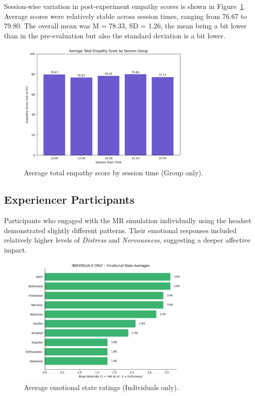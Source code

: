 \vspace{1em}

Session-wise variation in post-experiment empathy scores is shown in Figure~\ref{fig:empathy_group_sessions}. Average scores were relatively stable across session times, ranging from 76.67 to 79.80. The overall mean was M = 78.33, SD = 1.26, the mean being a bit lower than in the pre-evaluation but also the standard deviation is a bit lower. 

\begin{figure}[htbp]
    \centering
    \includegraphics[width=0.75\textwidth]{../../Figures/post-session-grp-empathy.png}
    \caption{Average total empathy score by session time (Group only).}
    \label{fig:empathy_group_sessions}
\end{figure}


\subsection{Experiencer Participants}

Participants who engaged with the MR simulation individually using the headset demonstrated slightly different patterns. Their emotional responses included relatively higher levels of \textit{Distress} and \textit{Nervousness}, suggesting a deeper affective impact.

\begin{figure}[H]
    \centering
    \includegraphics[width=0.75\textwidth]{../../Figures/emotional-post-indiv.png}
    \caption{Average emotional state ratings (Individuals only).}
    \label{fig:emotional_post_indiv}
\end{figure}

